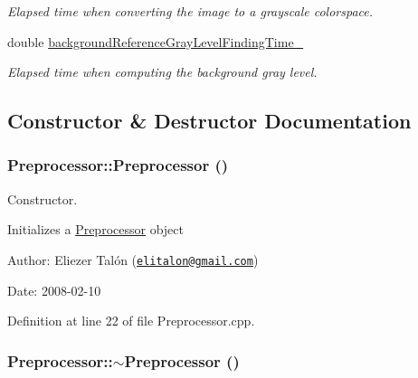 \begin{CompactItemize}
\begin{CompactList}\small\item\em Elapsed time when converting the image to a grayscale colorspace. \item\end{CompactList}\item 
\hypertarget{class_preprocessor_140ea3fa7bbd4e8fef54912d65c4e926}{
double \hyperlink{class_preprocessor_140ea3fa7bbd4e8fef54912d65c4e926}{backgroundReferenceGrayLevelFindingTime\_\-}}
\label{class_preprocessor_140ea3fa7bbd4e8fef54912d65c4e926}

\begin{CompactList}\small\item\em Elapsed time when computing the background gray level. \item\end{CompactList}\end{CompactItemize}


\subsection{Constructor \& Destructor Documentation}
\hypertarget{class_preprocessor_da966c8b83e7c3bcd8759549c3cdf688}{
\subsubsection[Preprocessor]{\setlength{\rightskip}{0pt plus 5cm}Preprocessor::Preprocessor ()}}
\label{class_preprocessor_da966c8b83e7c3bcd8759549c3cdf688}


Constructor. 

Initializes a \hyperlink{class_preprocessor}{Preprocessor} object

\begin{Desc}
\item[Author:]Eliezer Talón (\href{mailto:elitalon@gmail.com}{\tt elitalon@gmail.com}) \end{Desc}
\begin{Desc}
\item[Date:]2008-02-10 \end{Desc}


Definition at line 22 of file Preprocessor.cpp.\hypertarget{class_preprocessor_3c16724bc9e18b12a45f5a7fe2752b1b}{
\subsubsection[$\sim$Preprocessor]{\setlength{\rightskip}{0pt plus 5cm}Preprocessor::$\sim$Preprocessor ()}}
\label{class_preprocessor_3c16724bc9e18b12a45f5a7fe2752b1b}


